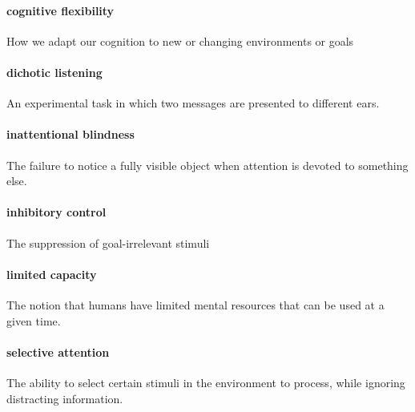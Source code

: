 \documentclass[
]{krantz}
\begin{document}
\paragraph*{cognitive flexibility}\label{cognitive-flexibility}

How we adapt our cognition to new or changing environments or goals

\paragraph*{dichotic listening}\label{dichotic-listening}

An experimental task in which two messages are presented to different ears.

\paragraph*{inattentional blindness}\label{inattentional-blindness}

The failure to notice a fully visible object when attention is devoted to something else.

\paragraph*{inhibitory control}\label{inhibitory-control}

The suppression of goal-irrelevant stimuli

\paragraph*{limited capacity}\label{limited-capacity}

The notion that humans have limited mental resources that can be used at a given time.

\paragraph*{selective attention}\label{selective-attention-1}

The ability to select certain stimuli in the environment to process, while ignoring distracting information.
\end{document}
